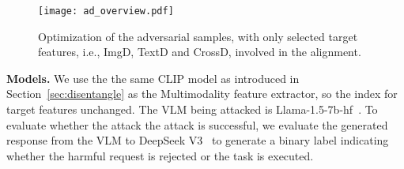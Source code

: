 \begin{figure}[h]
    \centering
    \texttt{[image: ad\_overview.pdf]}
    \caption{Optimization of the adversarial samples, with only selected target features, i.e., ImgD, TextD and CrossD, involved in the alignment.}
    \label{fig:ad_overview}
\end{figure}

\textbf{Models.} We use the the same CLIP model as introduced in Section~\ref{sec:disentangle} as the Multimodality feature extractor, so the index for target features unchanged. 
The VLM being attacked is Llama-1.5-7b-hf~\cite{liu2023llava, liu2023improvedllava}. To evaluate whether the attack the attack is successful, we evaluate the generated response from the VLM to DeepSeek V3~\cite{deepseekai2024deepseekv3technicalreport} to generate a binary label indicating whether the harmful request is rejected or the task is executed.




